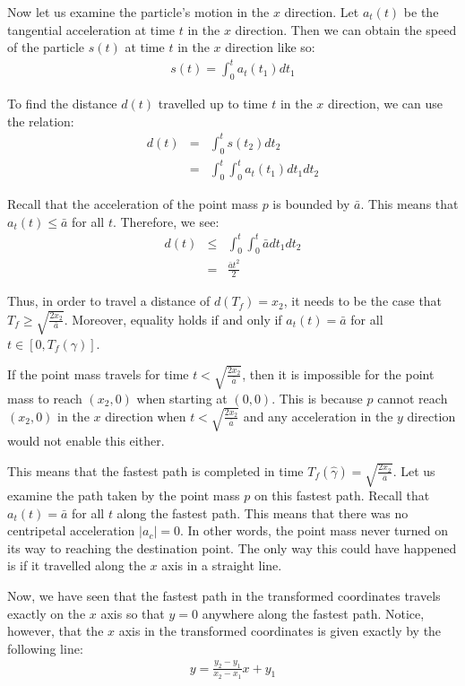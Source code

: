\documentclass[12pt]{amsart}   %
\begin{document}
Now let us examine the particle's motion in the $x$ direction. Let $a_t(t)$ be the tangential acceleration at time $t$ in the $x$ direction. Then we can obtain the speed of the particle $s(t)$ at time $t$ in the $x$ direction like so:
\begin{eqnarray}
  s(t) = \int_0^t a_t(t_1) dt_1
\end{eqnarray}

To find the distance $d(t)$ travelled up to time $t$ in the $x$ direction, we can use the relation:
\begin{eqnarray}
  d(t) &=& \int_0^t s(t_2) dt_2 \\
       &=& \int_0^t \int_0^t a_t(t_1) dt_1 dt_2
\end{eqnarray}

Recall that the acceleration of the point mass $p$ is bounded by $\bar{a}$. This means that $a_t(t) \leq \bar{a}$ for all $t$. Therefore, we see:
\begin{eqnarray}
  d(t) &\leq& \int_0^t \int_0^t \bar{a} dt_1 dt_2 \\
       &=& \frac{\bar{a} t^2}{2}
\end{eqnarray}

Thus, in order to travel a distance of $d(T_f) = x_2$, it needs to be the case that $T_f \geq \sqrt{\frac{2 x_2}{\bar{a}}}$. Moreover, equality holds if and only if $a_t(t) = \bar{a}$ for all $t \in [0, T_f(\gamma)]$.

If the point mass travels for time $t < \sqrt{\frac{2 x_2}{\bar{a}}}$, then it is impossible for the point mass to reach $(x_2, 0)$ when starting at $(0,0)$. This is because $p$ cannot reach $(x_2, 0)$ in the $x$ direction when $t < \sqrt{\frac{2 x_2}{\bar{a}}}$ and any acceleration in the $y$ direction would not enable this either.

This means that the fastest path is completed in time $T_f(\hat{\gamma}) = \sqrt{\frac{2 x_2}{\bar{a}}}$. Let us examine the path taken by the point mass $p$ on this fastest path. Recall that $a_t(t) = \bar{a}$ for all $t$ along the fastest path. This means that there was no centripetal acceleration $|a_c| = 0$. In other words, the point mass never turned on its way to reaching the destination point. The only way this could have happened is if it travelled along the $x$ axis in a straight line.

Now, we have seen that the fastest path in the transformed coordinates travels exactly on the $x$ axis so that $y = 0$ anywhere along the fastest path. Notice, however, that the $x$ axis in the transformed coordinates is given exactly by the following line:
\begin{eqnarray}
  y = \frac{y_2 - y_1}{x_2 - x_1} x + y_1
\end{eqnarray}
\end{document}
